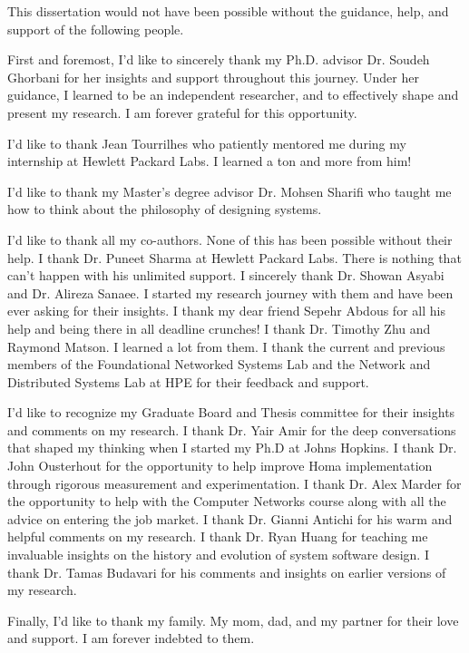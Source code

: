 
This dissertation would not have been possible without the guidance, help, and support of the following people.

First and foremost, I'd like to sincerely thank my Ph.D. advisor Dr. Soudeh Ghorbani for her insights and support throughout this journey. Under her guidance, I learned to be an independent researcher, and to effectively shape and present my research. I am forever grateful for this opportunity.

I'd like to thank Jean Tourrilhes who patiently mentored me during my internship at Hewlett Packard Labs. I learned a ton and more from him!

I'd like to thank my Master's degree advisor Dr. Mohsen Sharifi who taught me how to think about the philosophy of designing systems.

I'd like to thank all my co-authors. None of this has been possible without their help. I thank Dr. Puneet Sharma at Hewlett Packard Labs. There is nothing that can't happen with his unlimited support.
I sincerely thank Dr. Showan Asyabi and Dr. Alireza Sanaee. I started my research journey with them and have been ever asking for their insights. I thank my dear friend Sepehr Abdous for all his help and being there in all deadline crunches!
I thank Dr. Timothy Zhu and Raymond Matson. I learned a lot from them.
I thank the current and previous members of the Foundational Networked Systems Lab and the Network and Distributed Systems Lab at HPE for their feedback and support.

I'd like to recognize my Graduate Board and Thesis committee for their insights and comments on my research. I thank Dr. Yair Amir for the deep conversations that shaped my thinking when I started my Ph.D at Johns Hopkins. I thank Dr. John Ousterhout for the opportunity to help improve Homa implementation through rigorous measurement and experimentation.
I thank Dr. Alex Marder for the opportunity to help with the Computer Networks course along with all the advice on entering the job market. I thank Dr. Gianni Antichi for his warm and helpful comments on my research. I thank Dr. Ryan Huang for teaching me invaluable insights on the history and evolution of system software design. I thank Dr. Tamas Budavari for his comments and insights on earlier versions of my research.

Finally, I'd like to thank my family. My mom, dad, and my partner for their love and support. I am forever indebted to them.